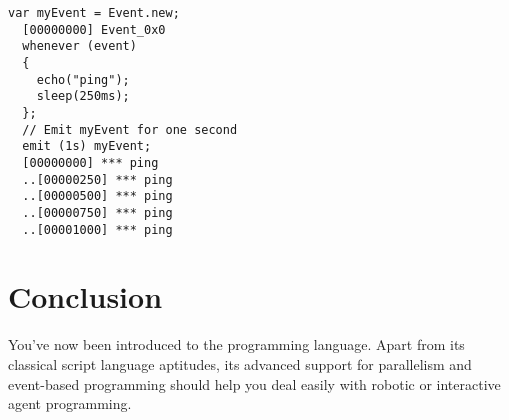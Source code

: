 \documentclass[openright,twoside,12pt]{report}
\begin{document}
\begin{lstlisting}[caption=Emitting events with a duration,
  label=lst:emit-duration]
  var myEvent = Event.new;
  [00000000] Event_0x0
  whenever (event)
  {
    echo("ping");
    sleep(250ms);
  };
  // Emit myEvent for one second
  emit (1s) myEvent;
  [00000000] *** ping
  ..[00000250] *** ping
  ..[00000500] *** ping
  ..[00000750] *** ping
  ..[00001000] *** ping
\end{lstlisting}








\chapter{Conclusion}

You've now been introduced to the \urbi programming language. Apart
from its classical script language aptitudes, its advanced support for
parallelism and event-based programming should help you deal easily
with robotic or interactive agent programming.
\end{document}
